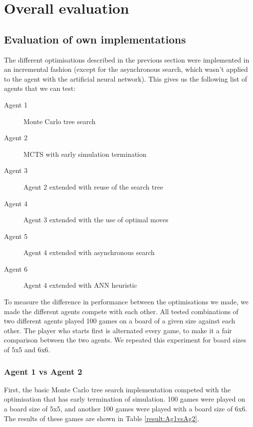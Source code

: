 \section{Overall evaluation}

\subsection{Evaluation of own implementations}
The different optimisations described in the previous section were implemented in an incremental fashion (except for the asynchronous search, which wasn't applied to the agent with the artificial neural network). This gives us the following list of agents that we can test:
\begin{description}
	\item[Agent 1] Monte Carlo tree search
	\item[Agent 2] MCTS with early simulation termination
	\item[Agent 3] Agent 2 extended with reuse of the search tree
	\item[Agent 4] Agent 3 extended with the use of optimal moves
	\item[Agent 5] Agent 4 extended with asynchronous search
	\item[Agent 6] Agent 4 extended with ANN heuristic
\end{description}

To measure the difference in performance between the optimisations we made, we made the different agents compete with each other. All tested combinations of two different agents played 100 games on a board of a given size against each other. The player who starts first is alternated every game, to make it a fair comparison between the two agents.
We repeated this experiment for board sizes of 5x5 and 6x6.

\subsubsection{Agent 1 vs Agent 2}
First, the basic Monte Carlo tree search implementation competed with the optimisation that has early termination of simulation. 100 games were played on a board size of 5x5, and another 100 games were played with a board size of 6x6. The results of these games are shown in Table \ref{result:Ag1vsAg2}.

